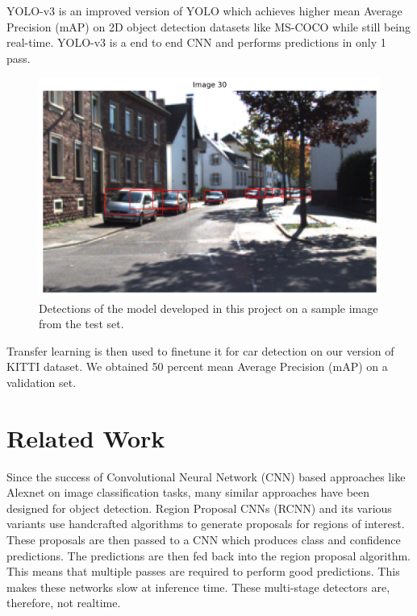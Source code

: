\documentclass[10pt,twocolumn,letterpaper]{article}
\begin{document}
YOLO-v3 is an improved version of YOLO \cite{redmon2016yolov1} which achieves 
higher mean Average Precision (mAP) on 2D object detection datasets like MS-COCO \cite{mscoco} while still being real-time. YOLO-v3 is a end to end CNN and performs predictions in only 1 pass.  

\begin{figure}[t]
	\begin{center}
		\includegraphics[width=1.0\linewidth]{figure30.png}
	\end{center}
	\caption{Detections of the model developed in this project on a sample image from the test set.}
	\label{fig:pred_example_plot}
\end{figure}

Transfer learning is then used to finetune it for car detection on our version of KITTI dataset. We obtained 50 percent mean Average Precision (mAP) on a validation set.
\section{Related Work}
Since the success of Convolutional Neural Network (CNN) based approaches like Alexnet \cite{Alexnet} on image classification tasks, many similar approaches have been designed for object detection. Region Proposal CNNs (RCNN) \cite{ren2015faster} and its various variants use handcrafted algorithms to generate proposals for regions of interest. These proposals are then passed to a CNN which produces class and confidence predictions. The predictions are then fed back into the region proposal algorithm. This means that multiple passes are required to perform good predictions. This makes these networks slow at inference time. These multi-stage detectors are, therefore, not realtime. 
\end{document}
